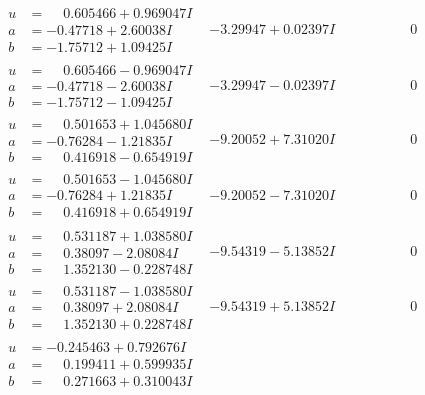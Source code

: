 \documentclass[1p]{elsarticle_modified}
\theoremstyle{definition}
\begin{document}
$$\begin{array}{c|c|c}
\begin{aligned}
u &= \phantom{-}0.605466 + 0.969047 I \\
a &= -0.47718 + 2.60038 I \\
b &= -1.75712 + 1.09425 I\end{aligned}
 & -3.29947 + 0.02397 I & \phantom{-0.000000 } 0 \\ \hline\begin{aligned}
u &= \phantom{-}0.605466 - 0.969047 I \\
a &= -0.47718 - 2.60038 I \\
b &= -1.75712 - 1.09425 I\end{aligned}
 & -3.29947 - 0.02397 I & \phantom{-0.000000 } 0 \\ \hline\begin{aligned}
u &= \phantom{-}0.501653 + 1.045680 I \\
a &= -0.76284 - 1.21835 I \\
b &= \phantom{-}0.416918 - 0.654919 I\end{aligned}
 & -9.20052 + 7.31020 I & \phantom{-0.000000 } 0 \\ \hline\begin{aligned}
u &= \phantom{-}0.501653 - 1.045680 I \\
a &= -0.76284 + 1.21835 I \\
b &= \phantom{-}0.416918 + 0.654919 I\end{aligned}
 & -9.20052 - 7.31020 I & \phantom{-0.000000 } 0 \\ \hline\begin{aligned}
u &= \phantom{-}0.531187 + 1.038580 I \\
a &= \phantom{-}0.38097 - 2.08084 I \\
b &= \phantom{-}1.352130 - 0.228748 I\end{aligned}
 & -9.54319 - 5.13852 I & \phantom{-0.000000 } 0 \\ \hline\begin{aligned}
u &= \phantom{-}0.531187 - 1.038580 I \\
a &= \phantom{-}0.38097 + 2.08084 I \\
b &= \phantom{-}1.352130 + 0.228748 I\end{aligned}
 & -9.54319 + 5.13852 I & \phantom{-0.000000 } 0 \\ \hline\begin{aligned}
u &= -0.245463 + 0.792676 I \\
a &= \phantom{-}0.199411 + 0.599935 I \\
b &= \phantom{-}0.271663 + 0.310043 I\end{aligned}

\end{array}$$
\end{document}
